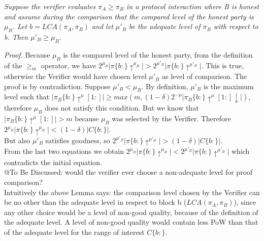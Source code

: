\begin{lemma}
	\textit{Suppose the verifier evaluates $\pi_A \geq \pi_B$ in a
	protocol interaction where B is honest and assume during the comparison that the
	compared level of the honest party is $\mu_B$. Let $b = LCA(\pi_A, \pi_B)$ and
	let ${\mu}'_B$ be the adequate level of $\pi_B$ with respect to b. Then ${\mu}'_B
	\geq \mu_B$.}
	\label{lemm:greatest_adequate}
\end{lemma}
\textit{Proof.} Because $\mu_B$ is the compared level of the honest party, from
the definition of the $\geq_m$ operator, we have $2^{\mu_B} \vert \pi\{b:\}\uparrow^{\mu_B}
\vert > 2^{{\mu}'_B} \vert \pi\{b:\}\uparrow^{{\mu}'_B} \vert $. This is true,
otherwise the Verifier would have chosen level $\mu'_B$ as level of comparison.
The proof is by contradiction. Suppose $\mu'_B < \mu_B$.
By definition, $\mu'_B$ is the maximum level such that $\vert \pi_B\{b:\}\uparrow^\mu
[1:] \vert \geq max(m, (1-\delta)2^{-\mu}\vert \pi_B\{b:\}\uparrow^\mu [1:]\downarrow
\vert)$, therefore $\mu_B$ does not satisfy this condition.
But we know that $\vert \pi_B\{b:\}\uparrow^\mu [1:] \vert > m$ because
$\mu_B$ was selected by the Verifier.
Therefore $ 2^{\mu_B} \vert \pi\{b:\}\uparrow^{\mu_B} \vert < (1-\delta)\vert
C\{b:\}\vert $. \\
But also $\mu'_B$ satisfies goodness, so $ 2^{\mu'_B} \vert \pi\{b:\}\uparrow^{\mu'_B}
\vert > (1-\delta)\vert C\{b:\}\vert $.\\ From the last two equations we obtain
$ 2^{\mu_B} \vert \pi\{b:\}\uparrow^{\mu_B} \vert < 2^{\mu'_B} \vert
\pi\{b:\}\uparrow^{\mu'_B} \vert$ which contradicts the initial equation.\\

@To Be Discussed: would the verifier ever choose a non-adequate level for proof comparison? \\
Intuitively the above Lemma says: the comparison level chosen by the Verifier can be
no other than the adequate level in respect to block b ($LCA(\pi_A, \pi_B)$), since
any other choice would be a level of non-good quality, because of the definition of
the adequate level. A level of non-good quality would contain less PoW than that of
the adequate level for the range of interest $C\{b:\}$. \\

